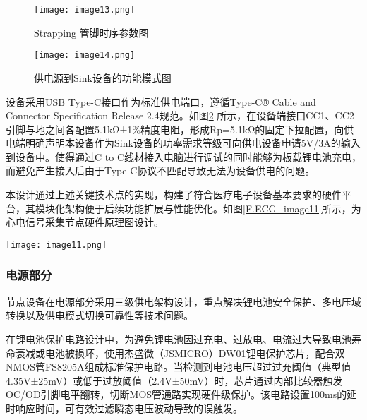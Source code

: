 \begin{figure}[H]
    \centering
    \texttt{[image: image13.png]}
    \caption{Strapping 管脚时序参数图}
    \label{F.ECG_image13}
\end{figure}

\begin{figure}[hbt]%
    \centering
    \texttt{[image: image14.png]}
    \caption{供电源到Sink设备的功能模式图}
    \label{F.ECG_image14}
\end{figure}

设备采用USB Type-C接口作为标准供电端口，遵循Type-C® Cable and Connector Specification Release 2.4规范。如图\ref{F.ECG_image14} \cite{usbtypec24}所示，在设备端接口CC1、CC2引脚与地之间各配置5.1kΩ±1$\%$精度电阻，形成Rp=5.1kΩ的固定下拉配置，向供电端明确声明本设备作为Sink设备的功率需求等级可向供电设备申请5V/3A的输入到设备中。使得通过C to C线材接入电脑进行调试的同时能够为板载锂电池充电，而避免产生接入后由于Type-C协议不匹配导致无法为设备供电的问题。

本设计通过上述关键技术点的实现，构建了符合医疗电子设备基本要求的硬件平台，其模块化架构便于后续功能扩展与性能优化。如图\ref{F.ECG_image11}所示，为心电信号采集节点硬件原理图设计。

\begin{sidewaysfigure}
    \centering
    \texttt{[image: image11.png]}
    \caption{心电信号采集节点主控部分硬件原理图设计}
    \label{F.ECG_image11}
\end{sidewaysfigure}

\newpage    %

\subsubsection{电源部分}

节点设备在电源部分采用三级供电架构设计，重点解决锂电池安全保护、多电压域转换以及供电模式切换可靠性等技术问题。

在锂电池保护电路设计中，为避免锂电池因过充电、过放电、电流过大导致电池寿命衰减或电池被损坏，使用杰盛微（JSMICRO）DW01锂电保护芯片，配合双NMOS管FS8205A组成标准保护电路。当检测到电池电压超过过充阈值（典型值4.35V±25mV）或低于过放阈值（2.4V±50mV）时，芯片通过内部比较器触发OC/OD引脚电平翻转，切断MOS管通路实现硬件级保护。该电路设置100ms的延时响应时间，可有效过滤瞬态电压波动导致的误触发。

